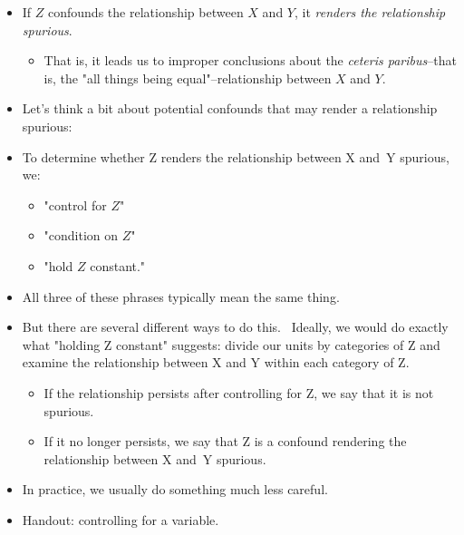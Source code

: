 \documentclass[11pt]{article}
\begin{document}
\begin{itemize}
\begin{itemize}
\item If $Z$ confounds the relationship between $X$ and $Y$, it \textit{%
renders the relationship spurious}.

\begin{itemize}
\item That is, it leads us to improper conclusions about the \textit{ceteris
paribus}--that is, the "all things being equal"--relationship between $X$
and $Y$.
\end{itemize}

\item Let's think a bit about potential confounds that may render a
relationship spurious:

\item To determine whether Z renders the relationship between X and\ Y
spurious, we:

\begin{itemize}
\item "control for $Z$"

\item "condition on $Z$"

\item "hold $Z$ constant."
\end{itemize}

\item All three of these phrases typically mean the same thing.

\item But there are several different ways to do this. \ Ideally, we would
do exactly what "holding Z constant" suggests: divide our units by
categories of Z and examine the relationship between X and Y within each
category of Z.

\begin{itemize}
\item If the relationship persists after controlling for Z, we say that it
is not spurious.

\item If it no longer persists, we say that Z is a confound rendering the
relationship between X and\ Y spurious.
\end{itemize}

\item In practice, we usually do something much less careful.

\item Handout: controlling for a variable.
\end{itemize}
\end{itemize}
\end{document}
